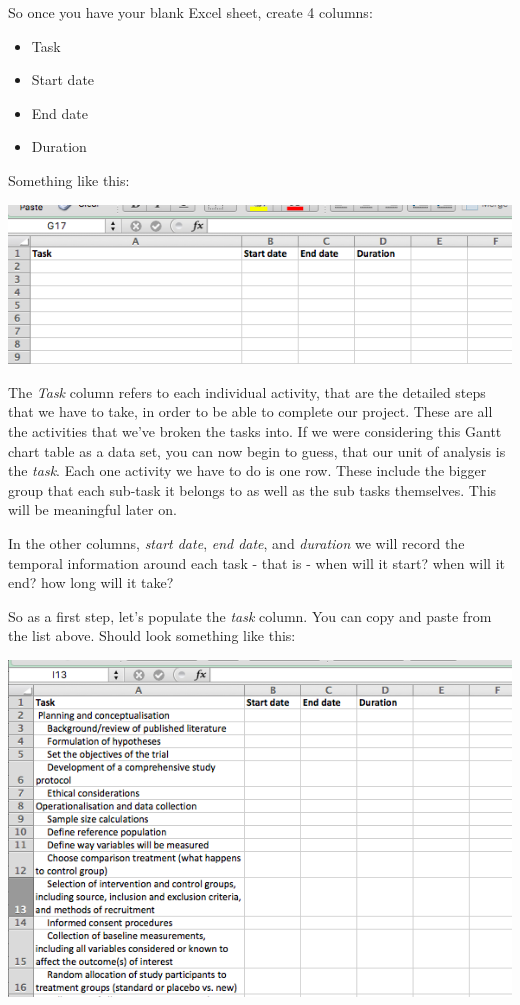 \documentclass[
]{book}
\providecommand{\tightlist}{%
  \setlength{\itemsep}{0pt}\setlength{\parskip}{0pt}}
\begin{document}
So once you have your blank Excel sheet, create 4 columns:

\begin{itemize}
\tightlist
\item
  Task
\item
  Start date
\item
  End date
\item
  Duration
\end{itemize}

Something like this:

\includegraphics{imgs/gantt_headers.png}

The \emph{Task} column refers to each individual activity, that are the detailed steps that we have to take, in order to be able to complete our project. These are all the activities that we've broken the tasks into. If we were considering this Gantt chart table as a data set, you can now begin to guess, that our unit of analysis is the \emph{task}. Each one activity we have to do is one row. These include the bigger group that each sub-task it belongs to as well as the sub tasks themselves. This will be meaningful later on.

In the other columns, \emph{start date}, \emph{end date}, and \emph{duration} we will record the temporal information around each task - that is - when will it start? when will it end? how long will it take?

So as a first step, let's populate the \emph{task} column. You can copy and paste from the list above. Should look something like this:

\includegraphics{imgs/task_subtask_pop.png}
\end{document}
